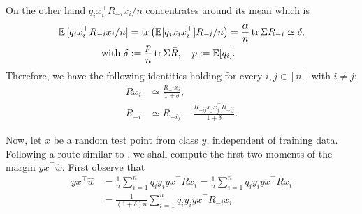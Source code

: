 On the other hand $q_i x_i^\top R_{-i} x_i/n$ concentrates around its mean which is
\begin{align*}
\mathbb E\,[q_i x_i^\top R_{-i} x_i/n] &= \operatorname{tr}\left(\mathbb E[q_i x_ix_i^\top] R_{-i}/n\right) = \frac{\alpha}{n}\operatorname{tr} \Sigma R_{-i} \simeq \delta,\\
\text{with }\delta &:= \frac{p}{n}\operatorname{tr}\Sigma\bar R,\quad p := \mathbb E[q_i].
\end{align*}
Therefore, we have the following identities holding for every $i,j \in [n]$ with $i \ne j$:
\begin{align}
Rx_i &\simeq \frac{R_{-i}x_i}{1+\delta},\\
R_{-i} &\simeq R_{-ij}-\frac{R_{-ij}x_jx_j^\top R_{-ij}}{1+\delta}.
\end{align}

Now, let $x$ be a random test point from class $y$, independent of training data. Following a route similar to \citep{Firdoussi2024}, we shall compute the first two moments of the margin $yx^\top \hat w$. First observe that
\begin{align}
yx^\top \hat w &= \frac{1}{n}\sum_{i=1}^n q_i y_i yx^\top R x_i = \frac{1}{n}\sum_{i=1}^n q_i y_i yx^\top R x_i\nonumber\\
&=\frac{1}{(1+\delta)n}\sum_{i=1}^n q_i y_i yx^\top R_{-i} x_i
\label{eq:pred-decomp}
\end{align}

